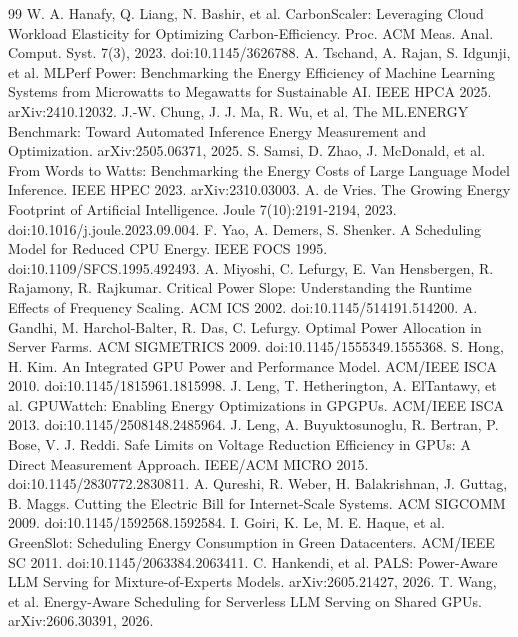\begin{thebibliography}{99}
\label{r30} W. A. Hanafy, Q. Liang, N. Bashir, et al. CarbonScaler: Leveraging Cloud Workload Elasticity for
Optimizing Carbon-Efficiency. Proc. ACM Meas. Anal. Comput. Syst. 7(3), 2023. doi:10.1145/3626788.
\label{r31} A. Tschand, A. Rajan, S. Idgunji, et al. MLPerf Power: Benchmarking the Energy Efficiency of Machine
Learning Systems from Microwatts to Megawatts for Sustainable AI. IEEE HPCA 2025. arXiv:2410.12032.
\label{r32} J.-W. Chung, J. J. Ma, R. Wu, et al. The ML.ENERGY Benchmark: Toward Automated Inference Energy
Measurement and Optimization. arXiv:2505.06371, 2025.
\label{r33} S. Samsi, D. Zhao, J. McDonald, et al. From Words to Watts: Benchmarking the Energy Costs of Large
Language Model Inference. IEEE HPEC 2023. arXiv:2310.03003.
\label{r34} A. de Vries. The Growing Energy Footprint of Artificial Intelligence. Joule 7(10):2191-2194, 2023.
doi:10.1016/j.joule.2023.09.004.
\label{r35} F. Yao, A. Demers, S. Shenker. A Scheduling Model for Reduced CPU Energy. IEEE FOCS 1995.
doi:10.1109/SFCS.1995.492493.
\label{r36} A. Miyoshi, C. Lefurgy, E. Van Hensbergen, R. Rajamony, R. Rajkumar. Critical Power Slope: Understanding
the Runtime Effects of Frequency Scaling. ACM ICS 2002. doi:10.1145/514191.514200.
\label{r37} A. Gandhi, M. Harchol-Balter, R. Das, C. Lefurgy. Optimal Power Allocation in Server Farms. ACM SIGMETRICS
2009. doi:10.1145/1555349.1555368.
\label{r38} S. Hong, H. Kim. An Integrated GPU Power and Performance Model. ACM/IEEE ISCA 2010.
doi:10.1145/1815961.1815998.
\label{r39} J. Leng, T. Hetherington, A. ElTantawy, et al. GPUWattch: Enabling Energy Optimizations in GPGPUs. ACM/IEEE
ISCA 2013. doi:10.1145/2508148.2485964.
\label{r40} J. Leng, A. Buyuktosunoglu, R. Bertran, P. Bose, V. J. Reddi. Safe Limits on Voltage Reduction Efficiency
in GPUs: A Direct Measurement Approach. IEEE/ACM MICRO 2015. doi:10.1145/2830772.2830811.
\label{r41} A. Qureshi, R. Weber, H. Balakrishnan, J. Guttag, B. Maggs. Cutting the Electric Bill for Internet-Scale
Systems. ACM SIGCOMM 2009. doi:10.1145/1592568.1592584.
\label{r42} I. Goiri, K. Le, M. E. Haque, et al. GreenSlot: Scheduling Energy Consumption in Green Datacenters. ACM/IEEE
SC 2011. doi:10.1145/2063384.2063411.
\label{r43} C. Hankendi, et al. PALS: Power-Aware LLM Serving for Mixture-of-Experts Models. arXiv:2605.21427, 2026.
\label{r44} T. Wang, et al. Energy-Aware Scheduling for Serverless LLM Serving on Shared GPUs. arXiv:2606.30391, 2026.

\end{thebibliography}
